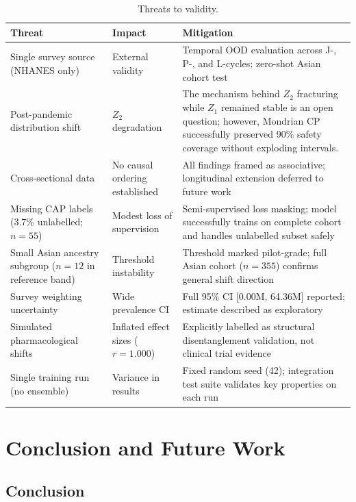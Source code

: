 \documentclass[12pt,a4paper,oneside]{report}
\begin{document}
\begin{table}[H]
\centering
\caption{Threats to validity.}
\label{tab:threats}
\begin{tabular}{p{4cm} p{4cm} p{5.5cm}}
\toprule
\textbf{Threat} & \textbf{Impact} & \textbf{Mitigation} \\ \midrule
Single survey source (NHANES only) & External validity & Temporal OOD evaluation across J-, P-, and L-cycles; zero-shot Asian cohort test \\
Post-pandemic distribution shift & $Z_2$ degradation & The mechanism behind $Z_2$ fracturing while $Z_1$ remained stable is an open question; however, Mondrian CP successfully preserved 90\% safety coverage without exploding intervals. \\
Cross-sectional data & No causal ordering established & All findings framed as associative; longitudinal extension deferred to future work \\
Missing CAP labels (3.7\% unlabelled; $n = 55$) & Modest loss of supervision & Semi-supervised loss masking; model successfully trains on complete cohort and handles unlabelled subset safely \\
Small Asian ancestry subgroup ($n = 12$ in reference band) & Threshold instability & Threshold marked pilot-grade; full Asian cohort ($n = 355$) confirms general shift direction \\
Survey weighting uncertainty & Wide prevalence CI & Full 95\% CI [0.00M, 64.36M] reported; estimate described as exploratory \\
Simulated pharmacological shifts & Inflated effect sizes ($r = 1.000$) & Explicitly labelled as structural disentanglement validation, not clinical trial evidence \\
Single training run (no ensemble) & Variance in results & Fixed random seed (42); integration test suite validates key properties on each run \\
\bottomrule
\end{tabular}
\end{table}

\chapter{Conclusion and Future Work}

\section{Conclusion}
\end{document}
